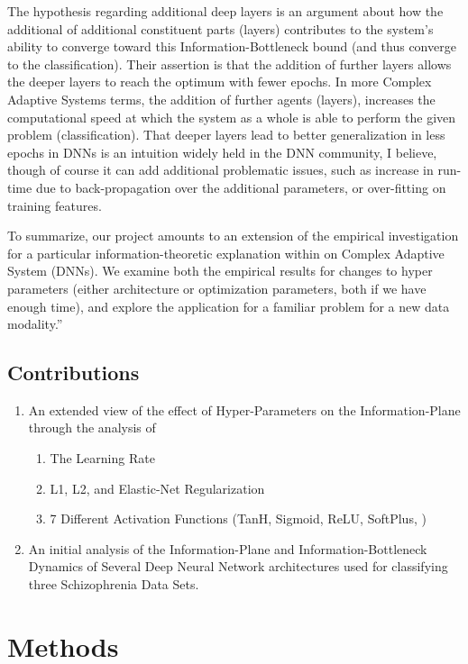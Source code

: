 \documentclass[conference, 5pt]{IEEEtran}
\begin{document}
The hypothesis regarding additional deep layers is an argument about how the additional of additional constituent parts (layers) contributes to the system's ability to converge toward this Information-Bottleneck bound (and thus converge to the classification). Their assertion is that the addition of further layers allows the deeper layers to reach the optimum with fewer epochs. In more Complex Adaptive Systems terms, the addition of further agents (layers), increases the computational speed at which the system as a whole is able to perform the given problem (classification). That deeper layers lead to better generalization in less epochs in DNNs is an intuition widely held in the DNN community, I believe, though of course it can add additional problematic issues, such as increase in run-time due to back-propagation over the additional parameters, or over-fitting on training features.

To summarize, our project amounts to an extension of the empirical investigation for a particular information-theoretic explanation within on Complex Adaptive System (DNNs). We examine both the empirical results for changes to hyper parameters (either architecture or optimization parameters, both if we have enough time), and explore the application for a familiar problem for a new data modality.''

\subsection{Contributions}

\begin{enumerate}
	\item An extended view of the effect of Hyper-Parameters on the Information-Plane through the analysis of 
    	\begin{enumerate}
        	\item The Learning Rate
            \item L1, L2, and Elastic-Net Regularization
            \item 7 Different Activation Functions (TanH, Sigmoid, ReLU, SoftPlus, )
        \end{enumerate}
    \item An initial analysis of the Information-Plane and Information-Bottleneck Dynamics of Several Deep Neural Network architectures used for classifying three Schizophrenia Data Sets.
\end{enumerate}

\section{Methods}
\end{document}
